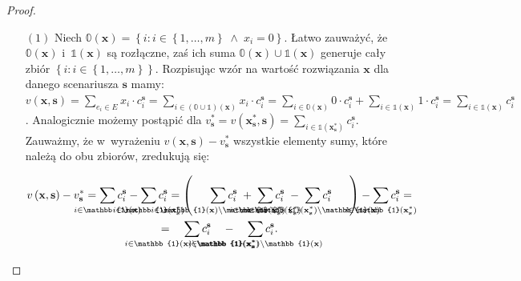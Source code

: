 \begin{proof}
	\begin{itemize}
		\item[$\left( 1 \right)$] Niech $\mathbb{0} \left( \textbf{x} \right) = \left\{ i : i \in \left\{ 1, \dots, m \right\} \; \wedge \; x_{i} = 0 \right\}$.
		Łatwo zauważyć, że $\mathbb{0} \left( \textbf{x} \right)$ i~$\mathbb{1} \left( \textbf{x} \right)$ są rozłączne, zaś ich suma $\mathbb{0} \left( \textbf{x} \right) \cup \mathbb{1} \left( \textbf{x} \right)$ generuje cały zbiór $\left\{ i : i \in \left\{ 1, \dots, m \right\} \right\}$.
		Rozpisując wzór na wartość rozwiązania $\textbf{x}$ dla danego scenariusza $\textbf{s}$ mamy: $v \left( \textbf{x}, \textbf{s} \right) = \sum_{e_{i} \in E} x_{i} \cdot c^{\textbf{s}}_{i} = \sum_{i \in \left( \mathbb{0} \cup \mathbb{1} \right) \left( \textbf{x} \right)} x_{i} \cdot c^{\textbf{s}}_{i} = \sum_{i \in \mathbb{0} \left( \textbf{x} \right)} 0 \cdot c^{\textbf{s}}_{i} + \sum_{i \in \mathbb{1} \left( \textbf{x} \right)} 1 \cdot c^{\textbf{s}}_{i} = \sum_{i \in \mathbb{1} \left( \textbf{x} \right)} c^{\textbf{s}}_{i}$.
		Analogicznie możemy postąpić dla $v^{\ast}_{\textbf{s}} = v \left( \textbf{x}^{\ast}_{\textbf{s}}, \textbf{s} \right) = \sum_{i \in \mathbb{1} \left( \textbf{x}^{\ast}_{\textbf{s}} \right)} c^{\textbf{s}}_{i}$.
		Zauważmy, że w~wyrażeniu $v \left( \textbf{x}, \textbf{s} \right) - v^{\ast}_{\textbf{s}}$ wszystkie elementy sumy, które należą do obu zbiorów, zredukują się:
		
		\begin{gather*}
			v \left( \textbf{x}, \textbf{s} \right) - v^{\ast}_{\textbf{s}} = \sum_{\mathclap{i \in \mathbb{1} \left( \textbf{x} \right)}} c^{\textbf{s}}_{i} - \sum_{\mathclap{i \in \mathbb{1} \left( \textbf{x}^{\ast}_{\textbf{s}} \right)}} c^{\textbf{s}}_{i} = \left( \quad \; \; \sum_{\mathclap{i \in \mathbb{1} \left( \textbf{x} \right) \setminus \mathbb{1} \left( \textbf{x}^{\ast}_{\textbf{s}} \right) }} c^{\textbf{s}}_{i} \; + \; \sum_{\mathclap{i \in \mathbb{1} \left( \textbf{x}^{\ast}_{\textbf{s}} \right) }} c^{\textbf{s}}_{i} \; - \; \sum_{\mathclap{i \in \mathbb{1} \left( \textbf{x}^{\ast}_{\textbf{s}} \right) \setminus \mathbb{1} \left( \textbf{x} \right) }} c^{\textbf{s}}_{i} \quad \; \; \right) - \sum_{\mathclap{i \in \mathbb{1} \left( \textbf{x}^{\ast}_{\textbf{s}} \right) }} c^{\textbf{s}}_{i} = \\ 
			= \quad \sum_{\mathclap{i \in \mathbb{1} \left( \textbf{x} \right) \setminus \mathbb{1} \left( \textbf{x}^{\ast}_{\textbf{s}} \right) }} c^{\textbf{s}}_{i} \quad - \quad \sum_{\mathclap{i \in \mathbb{1} \left( \textbf{x}^{\ast}_{\textbf{s}} \right) \setminus \mathbb{1} \left( \textbf{x} \right) }} c^{\textbf{s}}_{i}\text{.}
		\end{gather*}
		

\end{itemize}
\end{proof}
